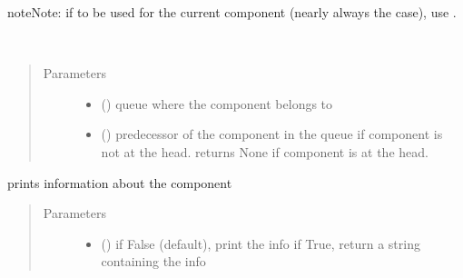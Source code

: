 \documentclass[letterpaper,10pt,english]{sphinxmanual}
\begin{document}
\begin{fulllineitems}
\begin{fulllineitems}
\begin{quote}
\begin{description}
\end{description}\end{quote}

\begin{sphinxadmonition}{note}{Note:}
if to be used for the current component (nearly always the case), use .
\end{sphinxadmonition}

\end{fulllineitems}


\begin{fulllineitems}
\label{\detokenize{Reference:salabim.Component.predecessor}}~\begin{quote}\begin{description}
\item[{Parameters}] \leavevmode\begin{itemize}
\item {} 
 ({\hyperref[\detokenize{Reference:salabim.Queue}]{}}) \textendash{} queue where the component belongs to

\item {} 
 ({\hyperref[\detokenize{Reference:salabim.Component}]{}}) \textendash{} predecessor of the component in the queue
if component is not at the head. 
returns None if component is at the head.

\end{itemize}

\end{description}\end{quote}

\end{fulllineitems}


\begin{fulllineitems}
\label{\detokenize{Reference:salabim.Component.print_info}}
prints information about the component
\begin{quote}\begin{description}
\item[{Parameters}] \leavevmode\begin{itemize}
\item {} 
 () \textendash{} if False (default), print the info
if True, return a string containing the info


\end{itemize}
\end{description}
\end{quote}
\end{fulllineitems}
\end{fulllineitems}
\end{document}
